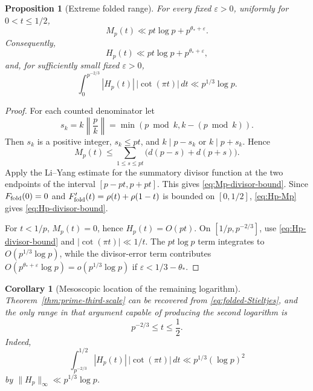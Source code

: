 \documentclass[11pt]{amsart}
\numberwithin{equation}{section}
\newtheorem{proposition}[theorem]{Proposition}
\newtheorem{corollary}[theorem]{Corollary}
\theoremstyle{definition}
\theoremstyle{remark}
\newcommand{\eps}{\varepsilon}
\begin{document}
\begin{proposition}[Extreme folded range]\label{prop:extreme-folded-range}
For every fixed \(\eps>0\), uniformly for \(0<t\le1/2\),
\begin{equation}\label{eq:Mp-divisor-bound}
 M_p(t)\ll pt\log p+p^{\theta_*+\eps}.
\end{equation}
Consequently,
\begin{equation}\label{eq:Hp-divisor-bound}
 H_p(t)\ll pt\log p+p^{\theta_*+\eps},
\end{equation}
and, for sufficiently small fixed \(\eps>0\),
\begin{equation}\label{eq:extreme-integral}
 \int_0^{p^{-2/3}}|H_p(t)|\,|\cot(\pi t)|\,dt
 \ll p^{1/3}\log p.
\end{equation}
\end{proposition}

\begin{proof}
For each counted denominator let
\[
 s_k=k\left\|\frac pk\right\|=\min(p\bmod k,k-(p\bmod k)).
\]
Then \(s_k\) is a positive integer, \(s_k\le pt\), and
\(k\mid p-s_k\) or \(k\mid p+s_k\).  Hence
\[
 M_p(t)\le\sum_{1\le s\le pt}\bigl(d(p-s)+d(p+s)\bigr).
\]
Apply the Li--Yang estimate for the summatory divisor function at the two
endpoints of the interval \([p-pt,p+pt]\).  This gives
\eqref{eq:Mp-divisor-bound}.  Since \(F_{\rm fold}(0)=0\) and
\(F_{\rm fold}'(t)=\rho(t)+\rho(1-t)\) is bounded on \([0,1/2]\),
\eqref{eq:Hp-Mp} gives \eqref{eq:Hp-divisor-bound}.

For \(t<1/p\), \(M_p(t)=0\), hence \(H_p(t)=O(pt)\).  On
\([1/p,p^{-2/3}]\), use \eqref{eq:Hp-divisor-bound} and
\(|\cot(\pi t)|\ll1/t\).  The \(pt\log p\) term integrates to
\(O(p^{1/3}\log p)\), while the divisor-error term contributes
\(O(p^{\theta_*+\eps}\log p)=o(p^{1/3}\log p)\) if
\(\eps<1/3-\theta_*\).
\end{proof}

\begin{corollary}[Mesoscopic location of the remaining logarithm]\label{cor:mesoscopic-log}
Theorem~\ref{thm:prime-third-scale} can be recovered from
\eqref{eq:folded-Stieltjes}, and the only range in that argument capable of
producing the second logarithm is
\begin{equation}\label{eq:mesoscopic-range}
 p^{-2/3}\le t\le\frac12.
\end{equation}
Indeed,
\begin{equation}\label{eq:mesoscopic-current-bound}
 \int_{p^{-2/3}}^{1/2}|H_p(t)|\,|\cot(\pi t)|\,dt
 \ll p^{1/3}(\log p)^2
\end{equation}
by \(\|H_p\|_\infty\ll p^{1/3}\log p\).
\end{corollary}
\end{document}
